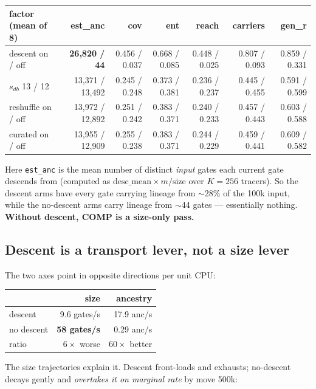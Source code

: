 \documentclass[11pt]{article}
\newcommand{\code}[1]{\texttt{#1}}
\begin{document}
\begin{table}[h]\centering\small
\begin{tabular}{lrrrrrr}
\toprule
factor (mean of 8) & est\_anc & cov & ent & reach & carriers & gen\_r \\
\midrule
descent on / off & \textbf{26{,}820 / 44} & 0.456 / 0.037 & 0.668 / 0.085 & 0.448 / 0.025 & 0.807 / 0.093 & 0.859 / 0.331 \\
$s_{db}$ 13 / 12 & 13{,}371 / 13{,}492 & 0.245 / 0.248 & 0.373 / 0.381 & 0.236 / 0.237 & 0.445 / 0.455 & 0.591 / 0.599 \\
reshuffle on / off & 13{,}972 / 12{,}892 & 0.251 / 0.242 & 0.383 / 0.371 & 0.240 / 0.233 & 0.457 / 0.443 & 0.603 / 0.588 \\
curated on / off & 13{,}955 / 12{,}909 & 0.255 / 0.238 & 0.383 / 0.371 & 0.244 / 0.229 & 0.459 / 0.441 & 0.609 / 0.582 \\
\bottomrule
\end{tabular}
\end{table}

Here \code{est\_anc} is the mean number of distinct \emph{input} gates each
current gate descends from (computed as $\text{desc\_mean}\times m/\text{size}$
over $K{=}256$ tracers). So the descent arms have every gate carrying lineage
from $\sim$28\% of the 100k input, while the no-descent arms carry lineage
from $\sim$44 gates --- essentially nothing. \textbf{Without descent, COMP is
a size-only pass.}

\subsection{Descent is a transport lever, not a size lever}

The two axes point in opposite directions per unit CPU:

\begin{center}\small
\begin{tabular}{lrr}
\toprule
 & size & ancestry \\
\midrule
descent & 9.6 gates/s & 17.9 anc/s \\
no descent & \textbf{58 gates/s} & 0.29 anc/s \\
ratio & $6\times$ worse & $60\times$ better \\
\bottomrule
\end{tabular}
\end{center}

The size trajectories explain it. Descent front-loads and exhausts; no-descent
decays gently and \emph{overtakes it on marginal rate} by move 500k:
\end{document}
